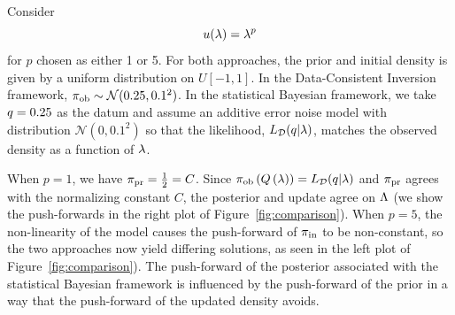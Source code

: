 \begin{ex}
Consider
\begin{equation}
u(\lambda) = \lambda^p
\end{equation}
for $p$ chosen as either 1 or 5.
For both approaches, the prior and initial density is given by a uniform distribution on $U[-1,1]$.
In the Data-Consistent Inversion framework, $\operatorname*{\pi_{ob}} \sim \mathcal{N}(0.25,0.1^2)$.
In the statistical Bayesian framework, we take $q=0.25$ as the datum and assume an additive error noise model with distribution $\mathcal{N}(0,0.1^2)$ so that the likelihood, $L_{\mathcal{D}}(q | \lambda)$, matches the observed density as a function of $\lambda$.

When $p=1$, we have $\operatorname*{\pi_{pr}} = \frac{1}{2} = C$.
Since $\operatorname*{\pi_{ob}}\left ( Q\left ( \lambda \right ) \right ) = L_{\mathcal{D}}(q|\lambda)$ and $\operatorname*{\pi_{pr}}$ agrees with the normalizing constant $C$, the posterior and update agree on ${\Lambda}$ (we show the push-forwards in the right plot of Figure~\ref{fig:comparison}).
When $p=5$, the non-linearity of the model causes the push-forward of $\operatorname*{\pi_{in}}$ to be non-constant, so the two approaches now yield differing solutions, as seen in the left plot of Figure~\ref{fig:comparison}).
The push-forward of the posterior associated with the statistical Bayesian framework is influenced by the push-forward of the prior in a way that the push-forward of the updated density avoids.


\end{ex}
